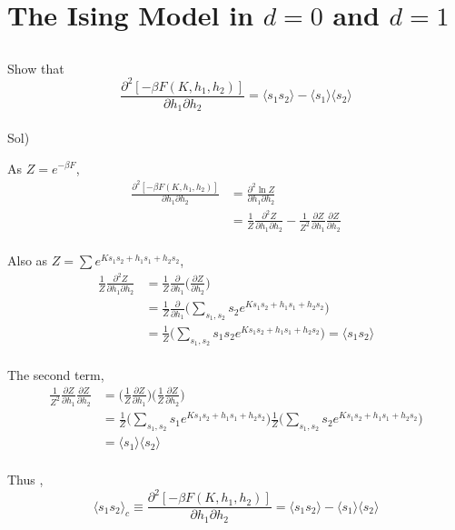 \documentclass[paper=a4, fontsize=11pt]{scrartcl}
\numberwithin{equation}{section}
\numberwithin{figure}{section}
\numberwithin{table}{section}
\newcommand{\pder}[2]{\frac{\partial #1}{\partial #2}}
\newcommand{\expval}[1]{\langle #1 \rangle}
\newenvironment{problem}{\subsection{}}{}
\newenvironment{solution}{Sol) \begin{adjustwidth}{0.2in}{}\vspace{0.1in}}{\end{adjustwidth}}
\begin{document}
\section{The Ising Model in $d=0$ and $d=1$}

\vskip 0.3in

\begin{problem}
	Show that \\
	\begin{equation}
		\frac{\partial^2 [-\beta F(K,h_1,h_2)]}{\partial h_1 \partial h_2} = \expval{s_1 s_2} - \expval{s_1}\expval{s_2} \nonumber
	\end{equation}
\end{problem} \\

\begin{solution}
	As $Z=e^{-\beta F}$,\\
	\begin{equation}
	\begin{split}
		\frac{\partial^2 [-\beta F(K,h_1,h_2)]}{\partial h_1 \partial h_2}  &= \frac{\partial^2 \ln Z }{\partial h_1 \partial h_2} \\[5pt] 
		&= \frac{1}{Z}\frac{\partial^2 Z}{\partial h_1 \partial h_2} - \frac{1}{Z^2}\pder{Z}{h_1}\pder{Z}{h_2}
	\end{split}
	\end{equation} \\
	Also as $Z=\sum e^{K s_1 s_2 + h_1 s_1 + h_2 s_2 }$, \\
	\begin{equation}
	\begin{split}
		\frac{1}{Z}\frac{\partial^2 Z}{\partial h_1 \partial h_2} &= \frac{1}{Z}\pder{}{h_1}\bigg(\pder{Z}{h_2}\bigg) \\[5pt]
		&= \frac{1}{Z}\pder{}{h_1} \bigg(\sum_{s_1,s_2} s_2 e^{K s_1 s_2 + h_1 s_1 + h_2 s_2 }\bigg) \\[5pt]
		&= \frac{1}{Z}\bigg(\sum_{s_1,s_2} s_1 s_2 e^{K s_1 s_2 + h_1 s_1 + h_2 s_2 }\bigg) = \expval{s_1 s_2}
	\end{split}
	\end{equation}\\
	The second term, \\
	\begin{equation}
		\begin{split}
		\frac{1}{Z^2}\pder{Z}{h_1}\pder{Z}{h_2} &= \bigg(\frac{1}{Z}\pder{Z}{h_1}\bigg)\bigg(\frac{1}{Z}\pder{Z}{h_2}\bigg) \\[5pt]
		&= \frac{1}{Z}\bigg(\sum_{s_1,s_2} s_1 e^{K s_1 s_2 + h_1 s_1 + h_2 s_2 }\bigg)\frac{1}{Z}\bigg(\sum_{s_1,s_2} s_2 e^{K s_1 s_2 + h_1 s_1 + h_2 s_2 }\bigg) \\[5pt]
		&= \expval{s_1}\expval{s_2}
		\end{split}
	\end{equation} \\
	Thus , \\
	\begin{equation}
		\expval{s_1 s_2}_c \equiv \frac{\partial^2 [-\beta F(K,h_1,h_2)]}{\partial h_1 \partial h_2} = \expval{s_1 s_2} - \expval{s_1}\expval{s_2}
	\end{equation}
\end{solution}
\end{document}
